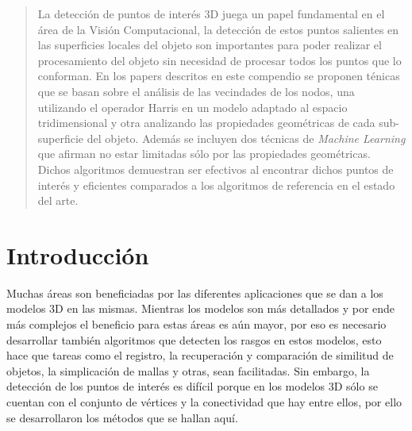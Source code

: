 \documentclass[conference]{IEEEtran}
\begin{document}
\maketitle

\begin{abstract}
La detección de puntos de interés 3D juega un papel fundamental en el área de la Visión Computacional, la detección de estos puntos salientes en las superficies locales del objeto son importantes para poder realizar el procesamiento del objeto sin necesidad de procesar todos los puntos que lo conforman. En los papers descritos en este compendio se proponen ténicas que se basan sobre el análisis de las vecindades de los nodos, una utilizando el operador Harris en un modelo adaptado al espacio tridimensional y otra analizando las propiedades geométricas de cada sub-superficie del objeto. Además se incluyen dos técnicas de \textit{Machine Learning} que afirman no estar limitadas sólo por las propiedades geométricas. Dichos algoritmos demuestran ser efectivos al encontrar dichos puntos de interés y eficientes comparados a los algoritmos de referencia en el estado del arte.
\end{abstract}





%
\IEEEpeerreviewmaketitle



\section{Introducción}
Muchas áreas son beneficiadas por las diferentes aplicaciones que se dan a los modelos 3D en las mismas. Mientras los modelos son más detallados y por ende más complejos el beneficio para estas áreas es aún mayor, por eso es necesario desarrollar también algoritmos que detecten los rasgos en estos modelos, esto hace que tareas como el registro, la recuperación y comparación de similitud de objetos, la simplicación de mallas y otras, sean facilitadas. Sin embargo, la detección de los puntos de interés es difícil porque en los modelos 3D sólo se cuentan con el conjunto de vértices y la conectividad que hay entre ellos, por ello se desarrollaron los métodos que se hallan aquí.
\end{document}
